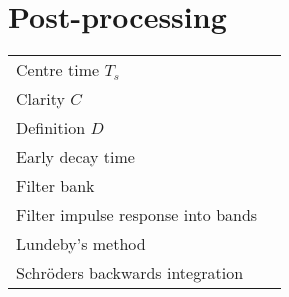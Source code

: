 
\section{Post-processing} %
\label{sec:post_processing}
\begin{tabular}{ll}
Centre time $T_s$ & \texttt{\nameref{cha:rbaCentreTime}} \\
Clarity $C$ &\texttt{\nameref{cha:rbaClarity}} \\
Definition $D$ &\texttt{\nameref{cha:rbaDefinition}} \\
Early decay time & \texttt{\nameref{cha:rbaEDT}} \\
Filter bank &\texttt{\nameref{cha:rbaFilterBank}} \\
Filter impulse response into bands & \texttt{\nameref{cha:rbaIR2OctaveBands}} \\
Lundeby's method & \texttt{\nameref{cha:rbaLundeby}} \\
Schröders backwards integration & \texttt{\nameref{cha:rbaSchroeder}}	
\end{tabular}


